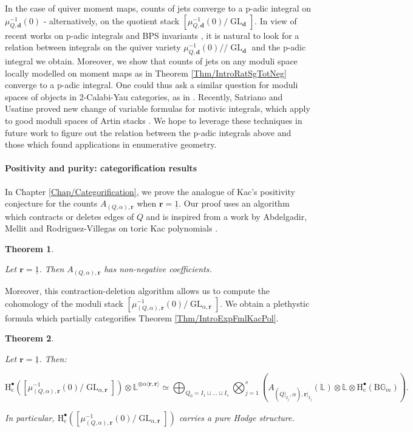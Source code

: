\documentclass[11pt,english]{article}
\numberwithin{equation}{section}
\numberwithin{figure}{section}
\theoremstyle{definition}
\theoremstyle{plain}
\newtheorem{thmintro}{Theorem}
\theoremstyle{remark}
\DeclareMathOperator{\GL}{GL}
\newcommand\dd{\mathbf{d}}
\newcommand\rr{\mathbf{r}}
\newcommand\HH{\mathrm{H}}
\newcommand\git{/\!\!/}
\begin{document}
In the case of quiver moment maps, counts of jets converge to a p-adic
integral on $\mu_{Q,\dd}^{-1}(0)$ - alternatively, on the quotient
stack $\left[\mu_{Q,\dd}^{-1}(0)/\GL_{\dd}\right]$. In view of recent
works on p-adic integrals and BPS invariants \cite{COW21,GWZ23a,GWZ23b},
it is natural to look for a relation between integrals on the quiver
variety $\mu_{Q,\dd}^{-1}(0)\git\GL_{\dd}$ and the p-adic integral
we obtain. Moreover, we show that counts of jets on any moduli space
locally modelled on moment maps as in Theorem \ref{Thm/IntroRatSgTotNeg}
converge to a p-adic integral. One could thus ask a similar question
for moduli spaces of objects in 2-Calabi-Yau categories, as in \cite{Dav21a}.
Recently, Satriano and Usatine proved new change of variable formulas
for motivic integrals, which apply to good moduli spaces of Artin
stacks \cite{SU21,SU23c}. We hope to leverage these techniques in
future work to figure out the relation between the p-adic integrals
above and those which found applications in enumerative geometry.

\paragraph*{Positivity and purity: categorification results}

In Chapter \ref{Chap/Categorification}, we prove the analogue of
Kac's positivity conjecture for the counts $A_{(Q,\alpha),\rr}$ when
$\rr=\underline{1}$. Our proof uses an algorithm which contracts
or deletes edges of $Q$ and is inspired from a work by Abdelgadir,
Mellit and Rodriguez-Villegas on toric Kac polynomials \cite{AMRV22}.

\begin{thmintro} \label{Thm/IntroPosToricKacPol}

Let $\rr=\underline{1}$. Then $A_{(Q,\alpha),\rr}$ has non-negative
coefficients.

\end{thmintro}

Moreover, this contraction-deletion algorithm allows us to compute
the cohomology of the moduli stack $\left[\mu_{(Q,\alpha),\rr}^{-1}(0)/\GL_{\alpha,\rr}\right]$.
We obtain a plethystic formula which partially categorifies Theorem
\ref{Thm/IntroExpFmlKacPol}.

\begin{thmintro} \label{Thm/IntroPurityToricPreprojStack}

Let $\rr=\underline{1}$. Then:

\[
\HH_{\mathrm{c}}^{\bullet}\left(\left[\mu_{(Q,\alpha),\rr}^{-1}(0)/\GL_{\alpha,\rr}\right]\right)
\otimes\mathbb{L}^{\otimes\alpha\langle\rr,\rr\rangle}
\simeq
\bigoplus_{Q_0=I_1\sqcup\ldots\sqcup I_s}
\bigotimes_{j=1}^s
\left(
A_{(Q\vert_{I_j},\alpha),\rr\vert_{I_j}}(\mathbb{L})\otimes\mathbb{L}\otimes \HH_{\mathrm{c}}^{\bullet}(\mathrm{B}\mathbb{G}_m)
\right).
\]

In particular, $\HH_{\mathrm{c}}^{\bullet}\left(\left[\mu_{(Q,\alpha),\rr}^{-1}(0)/\GL_{\alpha,\rr}\right]\right)$
carries a pure Hodge structure.

\end{thmintro}
\end{document}

